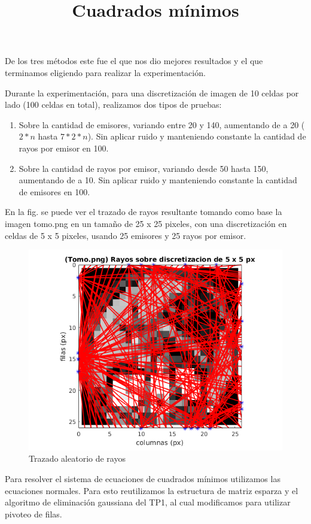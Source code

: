\par De los tres métodos este fue el que nos dio mejores resultados y el que terminamos eligiendo para realizar la experimentación.

\par Durante la experimentación, para una discretización de imagen de 10 celdas por lado (100 celdas en total), realizamos dos tipos de pruebas:
\begin{enumerate}
\item Sobre la cantidad de emisores, variando entre 20 y 140, aumentando de a 20 ($2*n$ hasta $7*2*n$). Sin aplicar ruido y manteniendo constante la cantidad de rayos por emisor en 100.
\item Sobre la cantidad de rayos por emisor, variando desde 50 hasta 150, aumentando de a 10.  Sin aplicar ruido y manteniendo constante la cantidad de emisores en 100.
\end{enumerate}

\par En la fig. se puede ver el trazado de rayos resultante tomando como base la imagen tomo.png en un tamaño de 25 x 25 pixeles, con una discretización en celdas de 5 x 5 pixeles, usando 25 emisores y 25 rayos por emisor.

\begin{figure}[H] 
\centering
\includegraphics[width=1\textwidth]{img/rayos_tomo25x25px.png}
\caption{Trazado aleatorio de rayos}
\label{fig:rayos aleatorios}
\end{figure}

\title{Cuadrados mínimos} Para resolver el sistema de ecuaciones de cuadrados mínimos utilizamos las ecuaciones normales. Para esto reutilizamos la estructura de matriz esparza y el algoritmo de eliminación gaussiana del TP1, al cual modificamos para utilizar pivoteo de filas.

